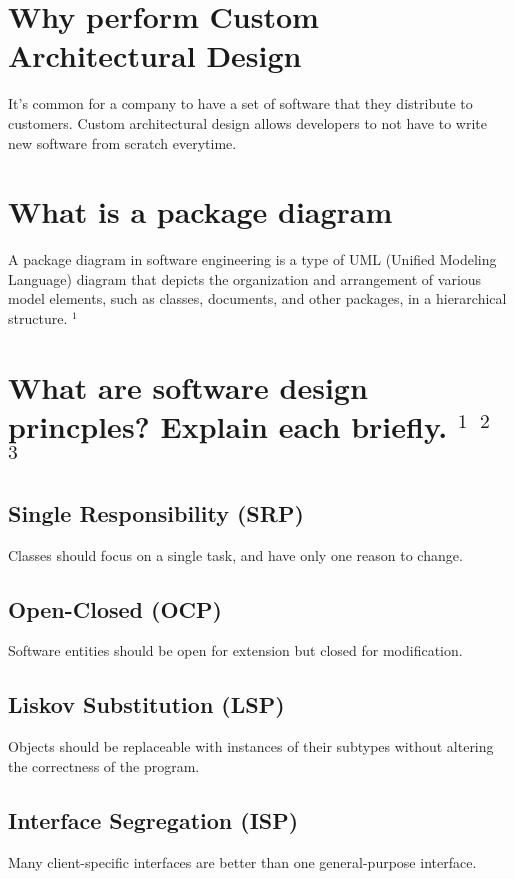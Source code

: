 \section{Why perform Custom Architectural Design}
It's common for a company to have a set of software that they distribute to customers. Custom architectural design allows developers to not have to write new software from scratch everytime.  

\section{What is a package diagram}
A package diagram in software engineering is a type of UML (Unified Modeling Language) diagram that depicts the organization and arrangement of various model elements, such as classes, documents, and other packages, in a hierarchical structure.
\href{https://www.lucidchart.com/pages/uml-package-diagram}{$^1$}

\section{What are software design princples? Explain each briefly.
\href{https://www.geeksforgeeks.org/principles-of-software-design/}{$^1$}
\href{https://swimm.io/learn/system-design/6-software-design-principles-used-by-successful-engineers}{$^2$}
\href{https://en.wikipedia.org/wiki/Software_architecture}{$^3$}
}
\subsection{Single Responsibility (SRP)}
Classes should focus on a single task, and have only one reason to change.
\subsection{Open-Closed (OCP)}
Software entities should be open for extension but closed for modification.
\subsection{Liskov Substitution (LSP)}
Objects should be replaceable with instances of their subtypes without altering the correctness of the program.
\subsection{Interface Segregation (ISP)}
Many client-specific interfaces are better than one general-purpose interface.
